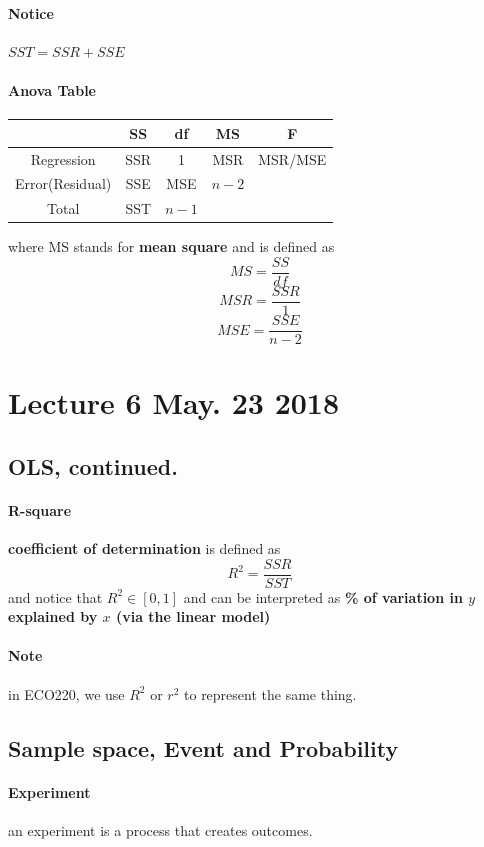 \documentclass{article}
\begin{document}
		\paragraph{Notice} $SST = SSR + SSE$
		\paragraph{Anova Table}
		\begin{center}
			\begin{tabular} {|c|c|c|c|c|}
				\hline
				 & SS & df & MS & F \\
				 \hline
				 Regression & SSR & 1 & MSR & MSR/MSE \\
				 \hline
				 Error(Residual) & SSE & MSE & $n-2$ & \\
				 \hline
				 Total & SST & $n-1$ & & \\
				 \hline
			\end{tabular}
		\end{center}
		where MS stands for \textbf{mean square} and is defined as
			\[
				MS = \frac{SS}{df}
			\]
			\[
				MSR = \frac{SSR}{1}
			\]
			\[
				MSE = \frac{SSE}{n-2}
			\]
			
		\section{Lecture 6 May. 23 2018}
		\subsection{OLS, continued.}
		\paragraph{R-square} \textbf{coefficient of determination} is defined as 
			\[
				R^2 = \frac{SSR}{SST}
			\]
			and notice that $R^2 \in [0, 1]$ and can be interpreted as \textbf{\% of variation in $y$ explained by $x$ (via the linear model)}
		\paragraph{Note} in ECO220, we use $R^2$ or $r^2$ to represent the same thing.
		
		\subsection{Sample space, Event and Probability}
		\paragraph{Experiment} an experiment is a process that creates  outcomes.
\end{document}

